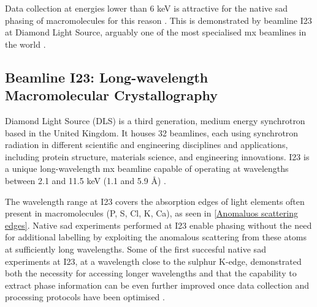 Data collection at energies lower than 6 \unit{keV} is attractive for the native \ac{sad} phasing of macromolecules for this reason \cite{Omari2023}. This is demonstrated %
by beamline I23 at Diamond Light Source, arguably one of the most specialised \ac{mx} beamlines in the world \cite{Foerster2019}. %

\subsection{Beamline I23: Long-wavelength Macromolecular Crystallography}

Diamond Light Source (DLS) is a third generation, medium energy synchrotron based in the United Kingdom. It houses 32 beamlines, each using synchrotron radiation in different scientific and engineering disciplines and applications, including protein structure, materials science, and engineering innovations.
I23 is a unique long-wavelength \ac{mx} beamline capable of operating at wavelengths between 2.1 and 11.5 \unit{keV} (1.1 and 5.9 Å) \cite{Wagner2016}.

The wavelength range at I23 covers the absorption edges of
light elements often present in macromolecules (P, S, Cl, K, Ca), as seen in \cref{Anomaluos scattering edges}.
Native \ac{sad} experiments performed at I23 enable phasing without the need for additional labelling by exploiting the anomalous scattering from these atoms at sufficiently long wavelengths. Some of the first succesful native \ac{sad} experiments at I23, at a wavelength close to the sulphur K-edge, demonstrated both the necessity for accessing longer wavelengths and that the capability to extract phase information can be even further improved once data collection and processing protocols have been optimised \cite{Aurelius2017}.

